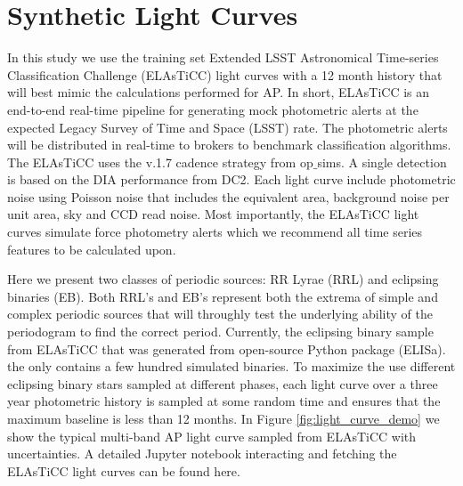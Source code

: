 \documentclass[DM,authoryear,toc]{lsstdoc}
\begin{document}
\section{Synthetic Light Curves}
In this study we use the training set Extended LSST Astronomical Time-series Classification Challenge (ELAsTiCC) light curves with a 12 month history that will best mimic the calculations performed for AP. In short, ELAsTiCC is an end-to-end real-time pipeline for generating mock photometric alerts at the expected Legacy Survey of Time and Space (LSST) rate. The photometric alerts will be distributed in real-time to brokers to benchmark classification algorithms. The ELAsTiCC uses the v.1.7 cadence strategy from op$\_$sims. A single detection is based on the DIA performance from DC2. Each light curve include photometric noise using Poisson noise that includes the equivalent area, background noise per unit area, sky and CCD read noise. Most importantly, the ELAsTiCC light curves simulate force photometry alerts which we recommend all time series features to be calculated upon. 
	
	Here we present two classes of periodic sources: RR Lyrae (RRL) and eclipsing binaries (EB). Both RRL's and EB's represent both the extrema of simple and complex periodic sources that will throughly test the underlying ability of the periodogram to find the correct period. Currently, the eclipsing binary sample from ELAsTiCC that was generated from open-source Python package (ELISa). the only contains a few hundred simulated binaries. To maximize the use different eclipsing binary stars sampled at different phases, each light curve over a three year photometric history is sampled at some random time and ensures that the maximum baseline is less than 12 months. In Figure \ref{fig:light_curve_demo} we show the typical multi-band AP light curve sampled from ELAsTiCC with uncertainties. A detailed Jupyter notebook interacting and fetching the ELAsTiCC light curves can be found here. 
\end{document}
